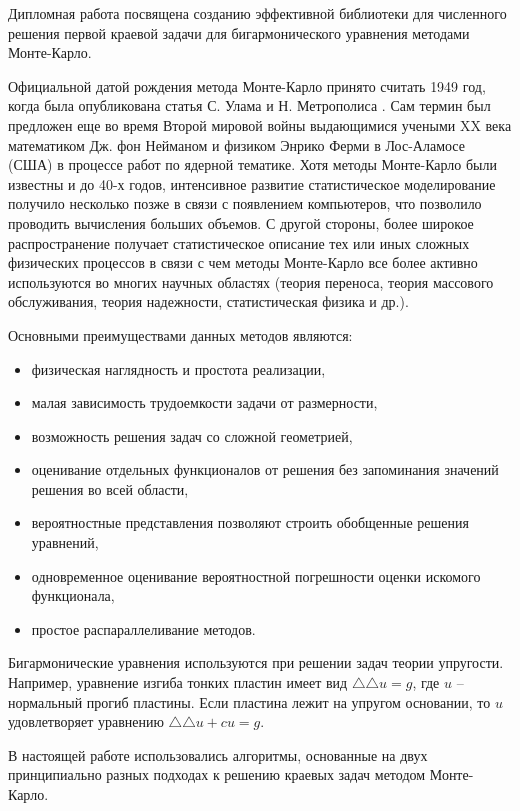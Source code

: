 \newpage{}

Дипломная работа посвящена созданию эффективной библиотеки для численного решения первой краевой задачи для бигармонического уравнения методами Монте-Карло. 

Официальной датой рождения метода Монте-Карло принято считать 1949 год, когда была опубликована статья С. Улама и Н. Метрополиса \cite{int:fist} . Сам термин был предложен еще во время Второй мировой войны выдающимися учеными XX века математиком Дж. фон Нейманом и физиком Энрико Ферми в Лос-Аламосе (США) в процессе работ по ядерной тематике. Хотя методы Монте-Карло были известны и до 40-х годов, интенсивное развитие статистическое моделирование получило несколько позже в связи с появлением компьютеров, что позволило проводить вычисления больших объемов. С другой стороны, более широкое распространение получает статистическое описание тех или иных сложных физических процессов в связи с чем методы Монте-Карло все более активно используются во многих научных областях (теория переноса, теория массового обслуживания, теория надежности, статистическая физика и др.).

Основными преимуществами данных методов являются:

\begin{itemize}
	\item физическая наглядность и простота реализации,
	\item малая зависимость трудоемкости задачи от размерности,
	\item возможность решения задач со сложной геометрией,
	\item оценивание отдельных функционалов от решения без запоминания значений решения во всей области,
	\item вероятностные представления позволяют строить обобщенные решения уравнений,
	\item одновременное оценивание вероятностной погрешности оценки искомого функционала,
	\item простое распараллеливание методов.
\end{itemize}

Бигармонические уравнения используются при решении задач теории упругости. Например, уравнение
изгиба тонких пластин имеет вид $\triangle\triangle u = g$, где $u$ --
нормальный прогиб пластины. Если пластина лежит на упругом
основании, то $u$ удовлетворяет уравнению $\triangle\triangle u
+cu=g$.

В настоящей работе использовались алгоритмы, основанные на двух принципиально разных подходах к решению краевых задач методом Монте-Карло.


